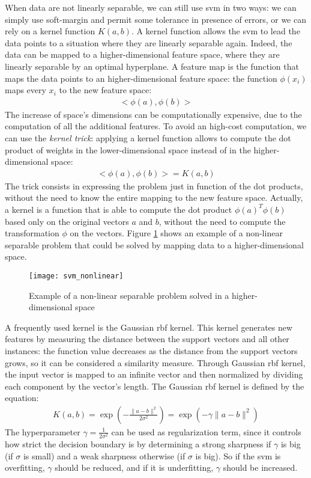 When data are not linearly separable, we can still use \acs{svm} in two ways: we can simply use soft-margin and permit some tolerance in presence of errors, or we can rely on a kernel function $K(a, b)$. A kernel function allows the \acs{svm} to lead the data points to a situation where they are linearly separable again. Indeed, the data can be mapped to a higher-dimensional feature space, where they are linearly separable by an optimal hyperplane. A feature map is the function that maps the data points to an higher-dimensional feature space: the function $\phi(x_i)$ maps every $x_i$ to the new feature space:
\begin{align}
    <\phi(a), \phi(b)>
\end{align}
The increase of space's dimensions can be computationally expensive, due to the computation of all the additional features. To avoid an high-cost computation, we can use the \textit{kernel trick}: applying a kernel function allows to compute the dot product of weights in the lower-dimensional space instead of in the higher-dimensional space:
\begin{align}
    <\phi(a), \phi(b)> = K(a, b)
\end{align}
The trick consists in expressing the problem just in function of the dot products, without the need to know the entire mapping to the new feature space. Actually, a kernel is a function that is able to compute the dot product $\phi(a)^T \phi(b)$ based only on the original vectors $a$ and $b$, without the need to compute the transformation $\phi$ on the vectors. Figure \ref{fig:svm_nonlinear} shows an example of a non-linear separable problem that could be solved by mapping data to a higher-dimensional space.
\begin{figure}[htbp]
    \centering
    \texttt{[image: svm\_nonlinear]}
    \caption{Example of a non-linear separable problem solved in a higher-dimensional space}
    \label{fig:svm_nonlinear}
\end{figure}

A frequently used kernel is the Gaussian \acf{rbf} kernel. This kernel generates new features by measuring the distance between the support vectors and all other instances: the function value decreases as the distance from the support vectors grows, so it can be considered a similarity measure. Through Gaussian \acs{rbf} kernel, the input vector is mapped to an infinite vector and then normalized by dividing each component by the vector’s length. The Gaussian \acs{rbf} kernel is defined by the equation:
\begin{align}
    K(a, b) = \exp \left(-\frac{\|a - b\|^{2}}{2 \sigma^{2}}\right) = \exp \left( -\gamma \|a - b\|^{2} \right)
\end{align}
The hyperparameter $\gamma = \frac{1}{2 \sigma^{2}}$ can be used as regularization term, since it controls how strict the decision boundary is by determining a strong sharpness if $\gamma$ is big (if $\sigma$ is small) and a weak sharpness otherwise (if $\sigma$ is big). So if the \acs{svm} is overfitting, $\gamma$ should be reduced, and if it is underfitting, $\gamma$ should be increased.

